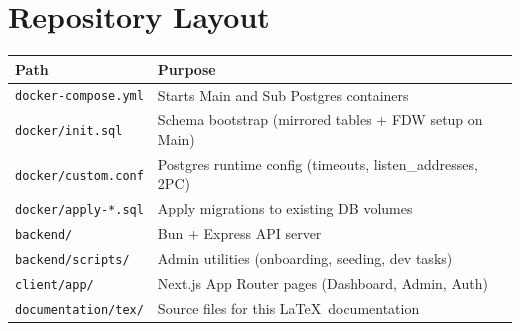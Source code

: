 \section{Repository Layout}
\begin{longtable}{@{}ll@{}}
\toprule
Path & Purpose \\
\midrule
\texttt{docker-compose.yml} & Starts Main and Sub Postgres containers \\
\texttt{docker/init.sql} & Schema bootstrap (mirrored tables + FDW setup on Main) \\
\texttt{docker/custom.conf} & Postgres runtime config (timeouts, listen\_addresses, 2PC) \\
\texttt{docker/apply-*.sql} & Apply migrations to existing DB volumes \\
\texttt{backend/} & Bun + Express API server \\
\texttt{backend/scripts/} & Admin utilities (onboarding, seeding, dev tasks) \\
\texttt{client/app/} & Next.js App Router pages (Dashboard, Admin, Auth) \\
\texttt{documentation/tex/} & Source files for this \LaTeX\ documentation \\
\bottomrule
\end{longtable}
